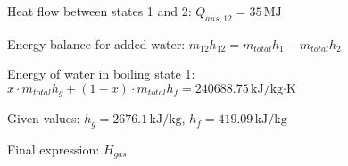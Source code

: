 Heat flow between states 1 and 2:  
\( Q_{aus,12} = 35 \, \text{MJ} \)  

Energy balance for added water:  
\( m_{12} h_{12} = m_{total} h_1 - m_{total} h_2 \)  

Energy of water in boiling state 1:  
\( x \cdot m_{total} h_g + (1 - x) \cdot m_{total} h_f = 240688.75 \, \text{kJ/kg·K} \)  

Given values:  
\( h_g = 2676.1 \, \text{kJ/kg} \), \( h_f = 419.09 \, \text{kJ/kg} \)  

Final expression:  
\( H_{gas} \)
